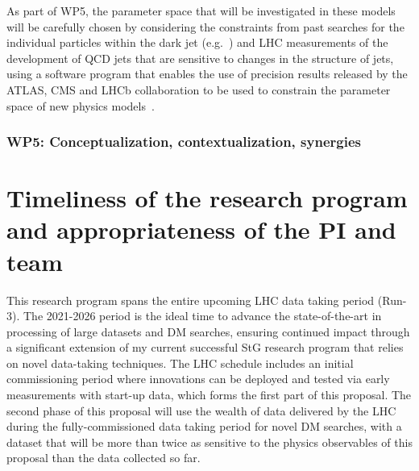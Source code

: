 \documentclass[11pt,a4paper]{article}
\begin{document}
As part of WP5, the parameter space that will be investigated in these models will be carefully chosen by considering the constraints from past searches for the individual particles within the dark jet (e.g.~\cite{DarkPion})  and LHC measurements of the development of QCD jets that are sensitive to changes in the structure of jets, using a software program that enables the use of precision results released by the ATLAS, CMS and LHCb collaboration to be used to constrain the parameter space of new physics models~\cite{CONTUR}. 

\subsubsection*{WP5: Conceptualization, contextualization, synergies}



\section{Timeliness of the research program and appropriateness of the PI and team} 
\smallskip

This research program spans the entire upcoming LHC data taking period (Run-3). The 2021-2026 period is the ideal time to advance the state-of-the-art in processing of large datasets and DM searches, ensuring continued impact through a significant extension of my current successful StG research program that relies on novel data-taking techniques. The LHC schedule includes an initial commissioning period where innovations can be deployed and tested via early measurements with start-up data, which forms the first part of this proposal. The second phase of this proposal will use the wealth of data delivered by the LHC during the fully-commissioned data taking period for novel DM searches, with a dataset that will be more than twice as sensitive to the physics observables of this proposal than the data collected so far. 
\end{document}
